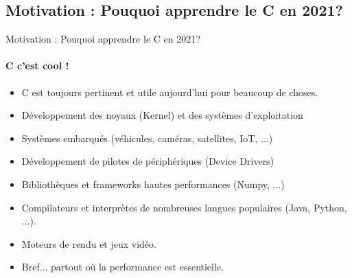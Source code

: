 \subsection{Motivation : Pouquoi apprendre le C en 2021?}
\begin{frame}{Motivation : Pouquoi apprendre le C en 2021?}
	\framesubtitle{C c'est cool !}%
	\begin{itemize}
		\item C est toujours pertinent et utile aujourd'hui pour beaucoup de choses.
		\item Développement des noyaux (Kernel) et des systèmes d'exploitation
		\item Systèmes embarqués (véhicules, caméras, satellites, IoT, ...)
		\item Développement de pilotes de périphériques (Device Drivers)
		\item Bibliothèques et frameworks hautes performances (Numpy, ...)
		\item Compilateurs et interprètes de nombreuses langues populaires (Java, Python, ...).
		\item Moteurs de rendu et jeux vidéo.
		\item Bref... partout où la performance est essentielle.
	\end{itemize}
\end{frame}
